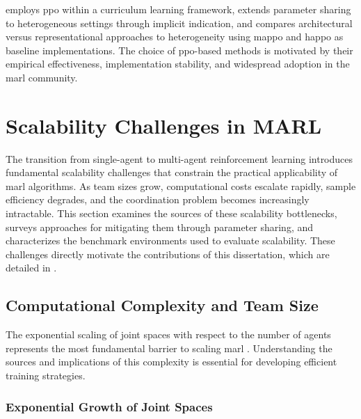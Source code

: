  employs \gls{ppo} within a curriculum learning framework, 
 extends parameter sharing to heterogeneous settings 
through implicit indication, and 
 compares architectural versus representational 
approaches to heterogeneity using \gls{mappo} and \gls{happo} 
as baseline implementations. The choice of \gls{ppo}-based methods 
is motivated by their empirical effectiveness, implementation stability, 
and widespread adoption in the \gls{marl} community.

\section{Scalability Challenges in MARL}
\label{sec:scalability-challenges}

The transition from single-agent to multi-agent reinforcement 
learning introduces fundamental scalability challenges that 
constrain the practical applicability of \gls{marl} algorithms. 
As team sizes grow, computational costs escalate rapidly, 
sample efficiency degrades, and the coordination problem 
becomes increasingly intractable. 
This section examines the sources of these scalability bottlenecks, 
surveys approaches for mitigating them through parameter sharing, 
and characterizes the benchmark environments used to evaluate scalability. 
These challenges directly motivate the contributions of this dissertation, 
which are detailed in .

\subsection{Computational Complexity and Team Size}
\label{subsec:computational-complexity}

The exponential scaling of joint spaces with respect to the 
number of agents represents the most fundamental barrier to 
scaling \gls{marl} \cite{gronauer2022, zhang2021}. 
Understanding the sources and implications of this complexity 
is essential for developing efficient training strategies.

\subsubsection{Exponential Growth of Joint Spaces}

